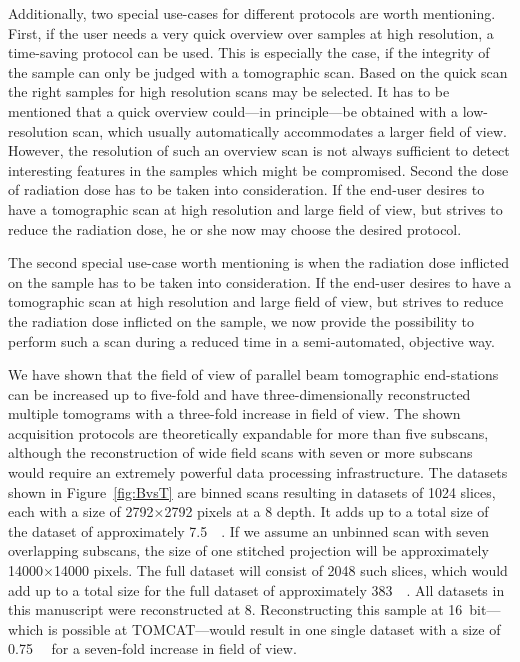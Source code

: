\documentclass[preprint,s]{iucr}
\begin{document}
Additionally, two special use-cases for different protocols are worth mentioning. First, if the user needs a very quick overview over samples at high resolution, a time-saving protocol can be used. This is especially the case, if the integrity of the sample can only be judged with a tomographic scan. Based on the quick scan the right samples for high resolution scans may be selected. It has to be mentioned that a quick overview could---in principle---be obtained with a low-resolution scan, which usually automatically accommodates a larger field of view. However, the resolution of such an overview scan is not always sufficient to detect interesting features in the samples which might be compromised.  Second the dose of radiation dose has to be taken into consideration. If the end-user desires to have a tomographic scan at high resolution and large field of view, but strives to reduce the radiation dose, he or she now may choose the desired protocol. 

The second special use-case worth mentioning is when the radiation dose inflicted on the sample has to be taken into consideration. If the end-user desires to have a tomographic scan at high resolution and large field of view, but strives to reduce the radiation dose inflicted on the sample, we now provide the possibility to perform such a scan during a reduced time in a semi-automated, objective way.

We have shown that the field of view of parallel beam tomographic end-stations can be increased up to five-fold and have three-dimensionally reconstructed multiple tomograms with a three-fold increase in field of view. The shown acquisition protocols are theoretically expandable for more than five subscans, although the reconstruction of wide field scans with seven or more subscans would require an extremely powerful data processing infrastructure. The datasets shown in Figure~\ref{fig:BvsT} are binned scans resulting in datasets of 1024 slices, each with a size of 2792$\times$2792 pixels at a \SI{8}{\bit} depth. It adds up to a total size of the dataset of approximately \SI{7.5}{\giga\byte}. If we assume an unbinned scan with seven overlapping subscans, the size of one stitched projection will be approximately 14000$\times$14000 pixels. The full dataset will consist of 2048 such slices, which would add up to a total size for the full dataset of approximately \SI{383}{\giga\byte}. All datasets in this manuscript were reconstructed at \SI{8}{\bit}. Reconstructing this sample at \SI{16}{bit}---which is possible at TOMCAT---would result in one single dataset with a size of \SI{0.75}{\tera\byte} for a seven-fold increase in field of view.
\end{document}
